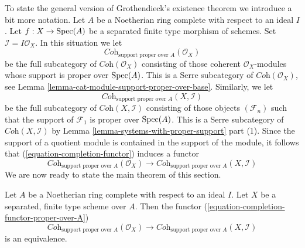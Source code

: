 \noindent
To state the general version of Grothendieck's existence theorem
we introduce a bit more notation. Let $A$ be a Noetherian ring
complete with respect to an ideal $I$. Let $f : X \to \mathop{\mathrm{Spec}}(A)$
be a separated finite type morphism of schemes. Set
$\mathcal{I} = I\mathcal{O}_X$. In this situation we let
$$
\textit{Coh}_{\text{support proper over } A}(\mathcal{O}_X)
$$
be the full subcategory of $\textit{Coh}(\mathcal{O}_X)$
consisting of those coherent $\mathcal{O}_X$-modules whose
support is proper over $\mathop{\mathrm{Spec}}(A)$. This is a Serre subcategory of
$\textit{Coh}(\mathcal{O}_X)$, see
Lemma \ref{lemma-cat-module-support-proper-over-base}.
Similarly, we let
$$
\textit{Coh}_{\text{support proper over } A}(X, \mathcal{I})
$$
be the full subcategory of $\textit{Coh}(X, \mathcal{I})$
consisting of those objects $(\mathcal{F}_n)$ such that
the support of $\mathcal{F}_1$ is proper over $\mathop{\mathrm{Spec}}(A)$.
This is a Serre subcategory of $\textit{Coh}(X, \mathcal{I})$
by Lemma \ref{lemma-systems-with-proper-support} part (1).
Since the support of a quotient module is contained in the support
of the module, it follows that (\ref{equation-completion-functor})
induces a functor
\begin{equation}
\label{equation-completion-functor-proper-over-A}
\textit{Coh}_{\text{support proper over }A}(\mathcal{O}_X)
\longrightarrow
\textit{Coh}_{\text{support proper over }A}(X, \mathcal{I})
\end{equation}
We are now ready to state the main theorem of this section.

\begin{theorem}
\label{theorem-grothendieck-existence}
\begin{reference}
\cite[III Theorem 5.1.5]{EGA}
\end{reference}
Let $A$ be a Noetherian ring complete with respect to an ideal $I$.
Let $X$ be a separated, finite type scheme over $A$. Then
the functor
(\ref{equation-completion-functor-proper-over-A})
$$
\textit{Coh}_{\text{support proper over }A}(\mathcal{O}_X)
\longrightarrow
\textit{Coh}_{\text{support proper over }A}(X, \mathcal{I})
$$
is an equivalence.
\end{theorem}

